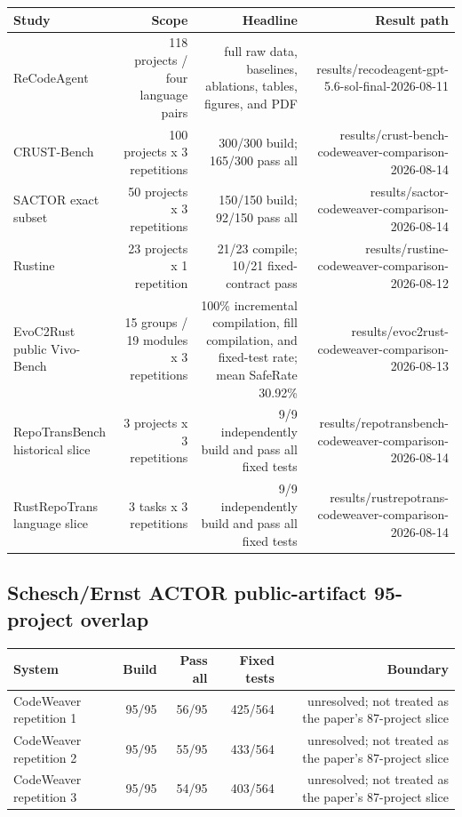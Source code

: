 \documentclass{article}
\begin{document}
\begin{tabular}{lrrr}
\toprule
Study & Scope & Headline & Result path \\
\midrule
ReCodeAgent & 118 projects / four language pairs & full raw data, baselines, ablations, tables, figures, and PDF & results/recodeagent-gpt-5.6-sol-final-2026-08-11 \\
CRUST-Bench & 100 projects x 3 repetitions & 300/300 build; 165/300 pass all & results/crust-bench-codeweaver-comparison-2026-08-14 \\
SACTOR exact subset & 50 projects x 3 repetitions & 150/150 build; 92/150 pass all & results/sactor-codeweaver-comparison-2026-08-14 \\
Rustine & 23 projects x 1 repetition & 21/23 compile; 10/21 fixed-contract pass & results/rustine-codeweaver-comparison-2026-08-12 \\
EvoC2Rust public Vivo-Bench & 15 groups / 19 modules x 3 repetitions & 100\% incremental compilation, fill compilation, and fixed-test rate; mean SafeRate 30.92\% & results/evoc2rust-codeweaver-comparison-2026-08-13 \\
RepoTransBench historical slice & 3 projects x 3 repetitions & 9/9 independently build and pass all fixed tests & results/repotransbench-codeweaver-comparison-2026-08-14 \\
RustRepoTrans language slice & 3 tasks x 3 repetitions & 9/9 independently build and pass all fixed tests & results/rustrepotrans-codeweaver-comparison-2026-08-14 \\
\bottomrule
\end{tabular}

\subsection*{Schesch/Ernst ACTOR public-artifact 95-project overlap}

\begin{tabular}{lrrrr}
\toprule
System & Build & Pass all & Fixed tests & Boundary \\
\midrule
CodeWeaver repetition 1 & 95/95 & 56/95 & 425/564 & unresolved; not treated as the paper's 87-project slice \\
CodeWeaver repetition 2 & 95/95 & 55/95 & 433/564 & unresolved; not treated as the paper's 87-project slice \\
CodeWeaver repetition 3 & 95/95 & 54/95 & 403/564 & unresolved; not treated as the paper's 87-project slice \\
\bottomrule
\end{tabular}
\end{document}

